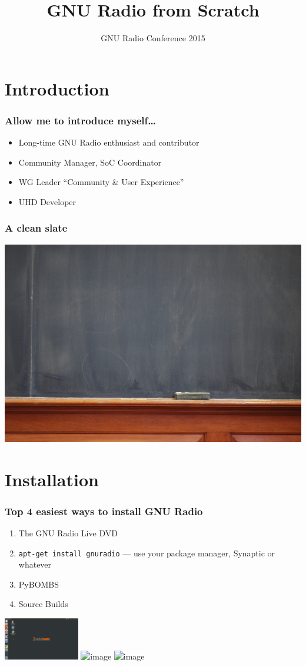 \documentclass{beamer}
\title{GNU Radio from Scratch}
\institute{Martin Braun, Ettus Research}
\date{GNU Radio Conference 2015}
\begin{document}
\frame{\titlepage}

\section{Introduction}

\begin{frame}
  \frametitle{Allow me to introduce myself\ldots}
  \begin{itemize}
    \item Long-time GNU Radio enthusiast and contributor
    \item Community Manager, SoC Coordinator
    \item WG Leader ``Community \& User Experience''
    \item UHD Developer
  \end{itemize}
\end{frame}

\begin{frame}
  \frametitle{A clean slate}
    \includegraphics[width=.9\textwidth]{clean_slate.jpg}
\end{frame}

\section{Installation}
\begin{frame}
  \frametitle{Top 4 easiest ways to install GNU Radio}
  \begin{enumerate}
    \item The GNU Radio Live DVD
    \item<2-> \texttt{apt-get install gnuradio} --- use your package manager, Synaptic or whatever
    \item<3-> PyBOMBS
    \item<4-> Source Builds
  \end{enumerate}
    \hspace{3em}
    \includegraphics[height=5em]{grlivedvd}
    \hspace{1em}
    \includegraphics<3->[height=5em]{pybombs_logo}
    \hspace{1em}
    \includegraphics<4->[height=5em]{srcbuild}
\end{frame}
\end{document}
